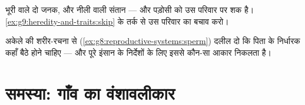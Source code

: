 \begin{exercise}[$\star\star$]\label{exo:g9:heredity-and-traits:11}
भूरी  वाले दो जनक, और नीली  वाली संतान --- और पड़ोसी को उस
परिवार पर शक है। \cref{ex:g9:heredity-and-traits:skip} के तर्क से उस
परिवार का बचाव करो।
\end{exercise}

\begin{exercise}[$\star\star\star$]\label{exo:g9:heredity-and-traits:12}
अकेले  की शरीर-रचना से
(\cref{ex:g8:reproductive-systems:sperm}) दलील दो कि पिता के निर्धारक
कहाँ बैठे होने चाहिए --- और पूरे इंसान के निर्देशों के लिए इससे कौन-सा
आकार निकलता है।
\end{exercise}

\section{समस्या: गाँव का वंशावलीकार}


